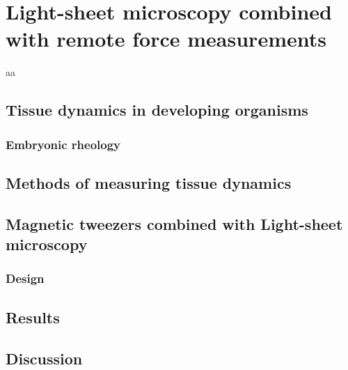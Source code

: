 \ifpdf
    \graphicspath{{Chapter3/Figs/Raster/}{Chapter3/Figs/PDF/}{Chapter3/Figs/}}
\else
    \graphicspath{{Chapter3/Figs/Vector/}{Chapter3/Figs/}}
\fi

\chapter[Light-sheet microscopy combined with remote force measurements]{Light-sheet microscopy combined with remote force measurements}%
aa

\section{Tissue dynamics in developing organisms}
\subsection{Embryonic rheology}
\section{Methods of measuring tissue dynamics}
\section{Magnetic tweezers combined with Light-sheet microscopy}
\subsection{Design}
\section{Results}
\section{Discussion}
